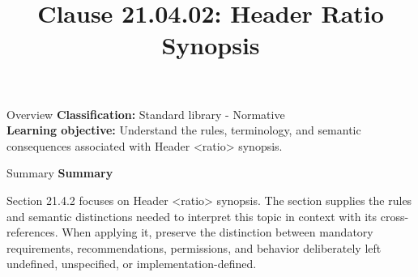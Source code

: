 \documentclass[10pt,letterpaper]{article}
\title{Clause 21.04.02: Header Ratio Synopsis}
\author{}
\date{}
\begin{document}
\maketitle
\begin{CornellOverviewBox}{Overview}
\textbf{Classification:} Standard library - Normative\\[2pt]
\textbf{Learning objective:} Understand the rules, terminology, and semantic consequences associated with Header <ratio> synopsis.
\end{CornellOverviewBox}\begin{CornellSummaryBox}{Summary}
{\sffamily\bfseries\color{Accent} Summary}\par\vspace{3pt}Section 21.4.2 focuses on Header <ratio> synopsis. The section supplies the rules and semantic distinctions needed to interpret this topic in context with its cross-references. When applying it, preserve the distinction between mandatory requirements, recommendations, permissions, and behavior deliberately left undefined, unspecified, or implementation-defined.
\end{CornellSummaryBox}
\end{document}
